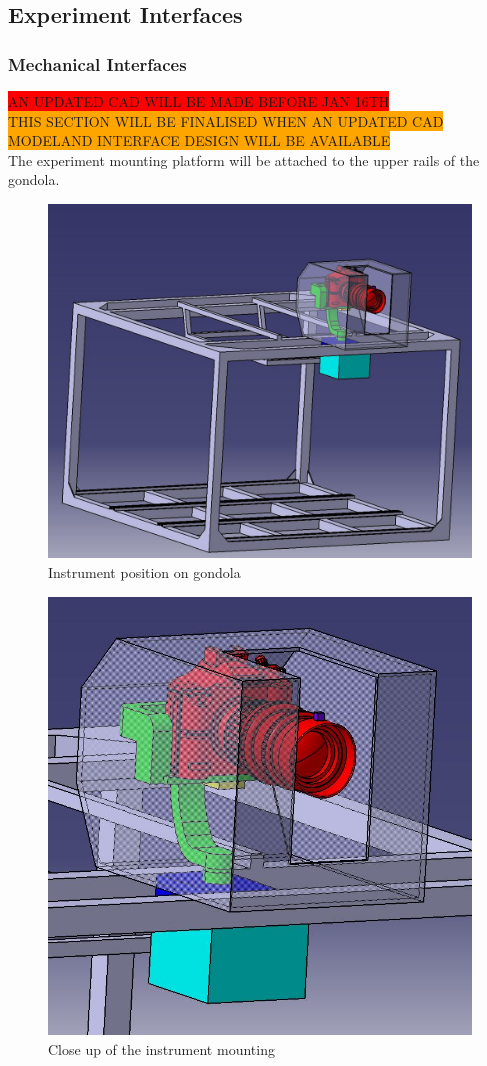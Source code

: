\subsection{Experiment Interfaces}

\subsubsection{Mechanical Interfaces}
\label{sec:4.2.1}

\colorbox{red}{AN UPDATED CAD WILL BE MADE BEFORE JAN 16TH}\\
\colorbox{orange}{THIS SECTION WILL BE FINALISED WHEN AN UPDATED CAD MODELAND INTERFACE DESIGN WILL BE AVAILABLE}\\
The experiment mounting platform will be attached to the upper rails of the gondola.



\begin{figure}[H]
    \centering
	\includegraphics[width=0.5\linewidth]{4-experiment-design/img/interfaces/Screenshot_Experiment.jpg}
	\caption{Instrument position on gondola}
\end{figure}

\begin{figure}[H]
    \centering
	\includegraphics[width=0.5\linewidth]{4-experiment-design/img/interfaces/Screenshot_Close_Up.jpg}
	\caption{Close up of the instrument mounting}
\end{figure}


